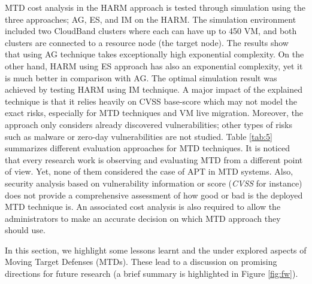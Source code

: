 MTD cost analysis in the HARM approach is tested through simulation using the three approaches; AG, ES, and IM on the HARM. The simulation environment included two CloudBand clusters where each can have up to 450 VM, and both clusters are connected to a resource node (the target node). The results show that using AG technique takes exceptionally high exponential complexity. On the other hand, HARM using ES approach has also an exponential complexity, yet it is much better in comparison with AG. The optimal simulation result was achieved by testing  HARM using IM technique. 
A major impact of the explained technique is that it relies heavily on CVSS base-score  which may not model the exact risks, especially for MTD techniques and VM live migration. Moreover, the approach only considers already discovered vulnerabilities; other types of risks such as malware or zero-day vulnerabilities are not studied. 
Table \ref{tab:5} summarizes different evaluation approaches for MTD techniques. It is noticed that every research work is observing and evaluating MTD from a different point of view. Yet, none of them considered the case of APT in MTD systems. Also, security analysis based on vulnerability information or score (\textit{CVSS} for instance) does not provide a comprehensive assessment of how good or bad is the deployed MTD technique is. An associated cost analysis is also required to allow the administrators to make an accurate decision on which MTD approach they should use.  
\fi

\label{research}
In this section, we highlight some lessons learnt and the under explored aspects of Moving Target Defenses (MTDs). These lead to a discussion on promising directions for future research (a brief summary is highlighted in Figure \ref{fig:fw}).

